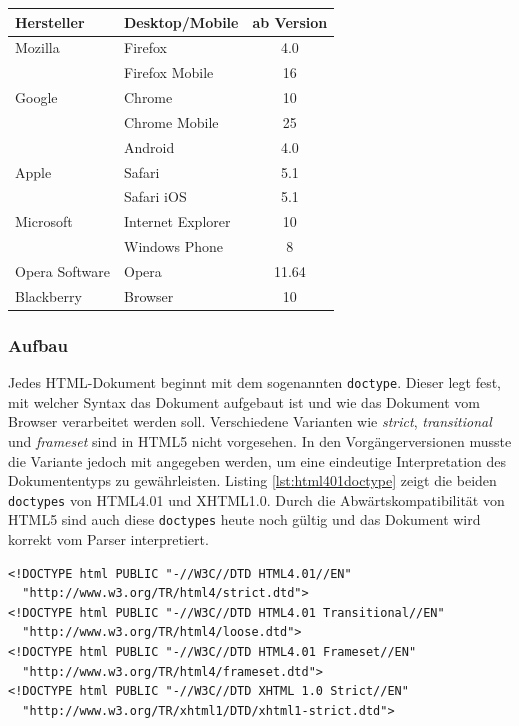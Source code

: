 \vspace{1em}
\begin{center}
  \begin{tabular}{ | l | l | c | }
  \hline
  \textbf{Hersteller} & \textbf{Desktop/Mobile} & \textbf{ab Version} \\ \hline \hline
  Mozilla & Firefox & 4.0\\
	\hline
	& Firefox Mobile & 16\\
	\hline
	Google & Chrome & 10\\
	\hline
	& Chrome Mobile & 25\\
	\hline
	& Android & 4.0\\
	\hline
	Apple & Safari & 5.1\\
	\hline
	& Safari iOS & 5.1\\
	\hline
	Microsoft & Internet Explorer & 10\\
	\hline
	& Windows Phone & 8\\
	\hline
	Opera Software & Opera & 11.64\\
	\hline
	Blackberry & Browser & 10\\
  \hline
  \end{tabular}
\label{tab:html5browserkomp}
\end{center}

\subsubsection{Aufbau} Jedes HTML-Dokument beginnt mit dem sogenannten \texttt{doctype}. Dieser legt fest, mit welcher Syntax das Dokument aufgebaut ist und wie das Dokument vom Browser verarbeitet werden soll. Verschiedene Varianten wie \textit{strict}, \textit{transitional} und \textit{frameset} sind in HTML5 nicht vorgesehen. In den Vorgängerversionen musste die Variante jedoch mit angegeben werden, um eine eindeutige Interpretation des Dokumententyps zu gewährleisten. Listing \ref{lst:html401doctype} zeigt die beiden \texttt{doctypes} von HTML4.01 und XHTML1.0. Durch die Abwärtskompatibilität von HTML5 sind auch diese \texttt{doctypes} heute noch gültig und das Dokument wird korrekt vom Parser interpretiert.

\vspace{1em}
\begin{lstlisting}[language=HTML5, caption=(X)HTML4.01 \texttt{doctype}, label=lst:html401doctype]
<!DOCTYPE html PUBLIC "-//W3C//DTD HTML4.01//EN"
  "http://www.w3.org/TR/html4/strict.dtd">
<!DOCTYPE html PUBLIC "-//W3C//DTD HTML4.01 Transitional//EN"
  "http://www.w3.org/TR/html4/loose.dtd">
<!DOCTYPE html PUBLIC "-//W3C//DTD HTML4.01 Frameset//EN"
  "http://www.w3.org/TR/html4/frameset.dtd">
<!DOCTYPE html PUBLIC "-//W3C//DTD XHTML 1.0 Strict//EN"
  "http://www.w3.org/TR/xhtml1/DTD/xhtml1-strict.dtd">
\end{lstlisting}
	
